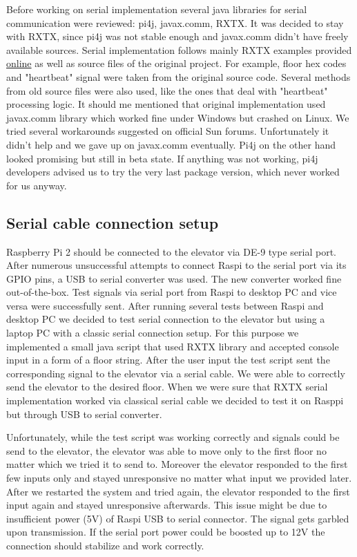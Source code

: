 \documentclass[a4paper, 12pt]{article}
\begin{document}
Before working on serial implementation several java libraries for serial communication were reviewed: pi4j, javax.comm, RXTX.
It was decided to stay with RXTX, since pi4j was not stable enough and javax.comm didn't have freely available sources.
Serial implementation follows mainly RXTX examples provided \href{http://rxtx.qbang.org/wiki/index.php/Two_way_communcation_with_the_serial_port}{online} as well as source files of the original project.
For example, floor hex codes and "heartbeat" signal were taken from the original source code.
Several methods from old source files were also used, like the ones that deal with "heartbeat" processing logic.
It should me mentioned that original implementation used javax.comm library which worked fine under Windows but crashed on Linux.
We tried several workarounds suggested on official Sun forums.
Unfortunately it didn't help and we gave up on javax.comm eventually.
Pi4j on the other hand looked promising but still in beta state.
If anything was not working, pi4j developers advised us to try the very last package version, which never worked for us anyway.

\subsection{Serial cable connection setup}
\label{sec:Serial_cable_connection_setup}
Raspberry Pi 2 should be connected to the elevator via DE-9 type serial port.
After numerous unsuccessful attempts to connect Raspi to the serial port via its GPIO pins, a USB to serial converter was used.
The new converter worked fine out-of-the-box.
Test signals via serial port from Raspi to desktop PC and vice versa were successfully sent.
After running several tests between Raspi and desktop PC we decided to test serial connection to the elevator but using a laptop PC with a classic serial connection setup.
For this purpose we implemented a small java script that used RXTX library and accepted console input in a form of a floor string.
After the user input the test script sent the corresponding signal to the elevator via a serial cable.
We were able to correctly send the elevator to the desired floor. When we were sure that RXTX serial implementation worked via classical serial cable we decided to test it on Rasppi but through USB to serial converter.

Unfortunately, while the test script was working correctly and signals could be send to the elevator, the elevator was able to move only to the first floor no matter which we tried it to send to.
Moreover the elevator responded to the first few inputs only and stayed unresponsive no matter what input we provided later. After we restarted the system and tried again, the elevator responded to the first input again and stayed unresponsive afterwards.
This issue might be due to insufficient power (5V) of Raspi USB to serial connector.
The signal gets garbled upon transmission.
If the serial port power could be boosted up to 12V the connection should stabilize and work correctly.
\end{document}
